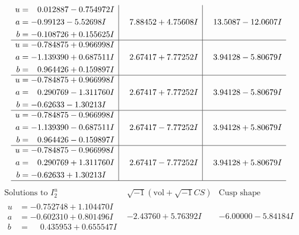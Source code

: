 \documentclass[1p]{elsarticle_modified}
\theoremstyle{definition}
\newcommand{\I}{\sqrt{-1}}
\begin{document}
$$\begin{array}{c|c|c}
\begin{aligned}
u &= \phantom{-}0.012887 - 0.754972 I \\
a &= -0.99123 - 5.52698 I \\
b &= -0.108726 + 0.155625 I\end{aligned}
 & \phantom{-}7.88452 + 4.75608 I & \phantom{-}13.5087 - 12.0607 I \\ \hline\begin{aligned}
u &= -0.784875 + 0.966998 I \\
a &= -1.139390 + 0.687511 I \\
b &= \phantom{-}0.964426 + 0.159897 I\end{aligned}
 & \phantom{-}2.67417 + 7.77252 I & \phantom{-}3.94128 - 5.80679 I \\ \hline\begin{aligned}
u &= -0.784875 + 0.966998 I \\
a &= \phantom{-}0.290769 - 1.311760 I \\
b &= -0.62633 - 1.30213 I\end{aligned}
 & \phantom{-}2.67417 + 7.77252 I & \phantom{-}3.94128 - 5.80679 I \\ \hline\begin{aligned}
u &= -0.784875 - 0.966998 I \\
a &= -1.139390 - 0.687511 I \\
b &= \phantom{-}0.964426 - 0.159897 I\end{aligned}
 & \phantom{-}2.67417 - 7.77252 I & \phantom{-}3.94128 + 5.80679 I \\ \hline\begin{aligned}
u &= -0.784875 - 0.966998 I \\
a &= \phantom{-}0.290769 + 1.311760 I \\
b &= -0.62633 + 1.30213 I\end{aligned}
 & \phantom{-}2.67417 - 7.77252 I & \phantom{-}3.94128 + 5.80679 I\\
 \hline 
 \end{array}$$\newpage$$\begin{array}{c|c|c}  
\text{Solutions to }I^u_{2}& \I (\text{vol} + \sqrt{-1}CS) & \text{Cusp shape}\\
 \hline 
\begin{aligned}
u &= -0.752748 + 1.104470 I \\
a &= -0.602310 + 0.801496 I \\
b &= \phantom{-}0.435953 + 0.655547 I\end{aligned}
 & -2.43760 + 5.76392 I & -6.00000 - 5.84184 I \\ \hline\begin{aligned}

\end{aligned}
\end{array}$$
\end{document}
